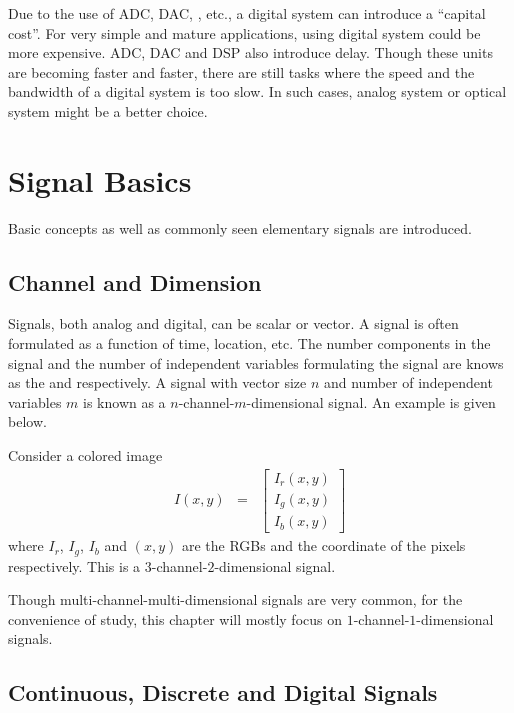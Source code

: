 Due to the use of ADC, DAC, , etc., a digital system can introduce a ``capital cost''. For very simple and mature applications, using digital system could be more expensive. ADC, DAC and DSP also introduce delay. Though these units are becoming faster and faster, there are still tasks where the speed and the bandwidth of a digital system is too slow. In such cases, analog system or optical system might be a better choice.

\section{Signal Basics} \label{sec:signal-basics}

Basic concepts as well as commonly seen elementary signals are introduced.

\subsection{Channel and Dimension}

Signals, both analog and digital, can be scalar or vector. A signal is often formulated as a function of time, location, etc. The number components in the signal and the number of independent variables formulating the signal are knows as the  and  respectively. A signal with vector size $n$ and number of independent variables $m$ is known as a $n$-channel-$m$-dimensional signal. An example is given below.

Consider a colored image
\begin{eqnarray}
	I(x,y) &=& \left[\begin{array}{c}
		I_r(x,y) \\
		I_g(x,y) \\
		I_b(x,y)
	\end{array}\right] \nonumber
\end{eqnarray}
where $I_r$, $I_g$, $I_b$ and $(x,y)$ are the RGBs and the coordinate of the pixels respectively. This is a $3$-channel-$2$-dimensional signal.

Though multi-channel-multi-dimensional signals are very common, for the convenience of study, this chapter will mostly focus on $1$-channel-$1$-dimensional signals.

\subsection{Continuous, Discrete and Digital Signals}

